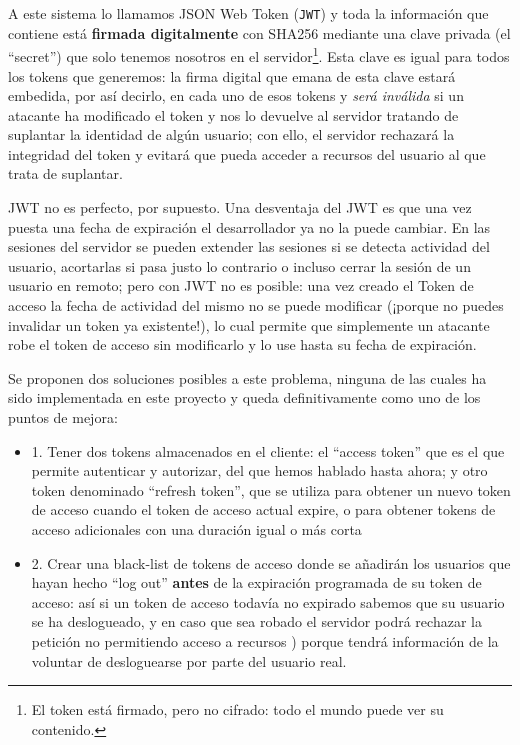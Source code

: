 \documentclass[a4paper,12pt]{report}
\begin{document}
				
				A este sistema lo llamamos JSON Web Token (\texttt{JWT}) y toda la información que contiene está \textbf{firmada digitalmente} con SHA256 mediante una clave privada (el ``secret'') que solo tenemos nosotros en el servidor\footnote{El token está firmado, pero no cifrado: todo el mundo puede ver su contenido.}. Esta clave es igual para todos los tokens que generemos: la firma digital que emana de esta clave estará embedida, por así decirlo, en cada uno de esos tokens y \textit{será inválida} si un atacante ha modificado el token y nos lo devuelve al servidor tratando de suplantar la identidad de algún usuario; con ello, el servidor rechazará la integridad del token y evitará que pueda acceder a recursos del usuario al que trata de suplantar.
				
				JWT no es perfecto, por supuesto. Una desventaja del JWT es que una vez puesta una fecha de expiración el desarrollador ya no la puede cambiar. En las sesiones del servidor se pueden extender las sesiones si se detecta actividad del usuario, acortarlas si pasa justo lo contrario o incluso cerrar la sesión de un usuario en remoto; pero con JWT no es posible: una vez creado el Token de acceso la fecha de actividad del mismo no se puede modificar (¡porque no puedes invalidar un token ya existente!), lo cual permite que simplemente un atacante robe el token de acceso sin modificarlo y lo use hasta su fecha de expiración.
				
				Se proponen dos soluciones posibles a este problema, ninguna de las cuales ha sido implementada en este proyecto y queda definitivamente como uno de los puntos de mejora:
				
				\begin{itemize}
					\setlength{\itemsep}{.0em}
				
					\item 1. Tener dos tokens almacenados en el cliente: el ``access token'' que es el que permite autenticar y autorizar, del que hemos hablado hasta ahora; y otro token denominado ``refresh token'', que se utiliza
					para obtener un nuevo token de acceso cuando el token de acceso actual expire, o para obtener tokens de acceso adicionales con una duración igual o más corta \cite{stackoverflow_refreshTokenAvantatjaSeguretat}
					
					\item 2. Crear una black-list de tokens de acceso donde se añadirán los usuarios que hayan hecho ``log out'' \textbf{antes} de la expiración programada de su token de acceso: así si un token de acceso todavía no expirado sabemos que su usuario se ha deslogueado, y en caso que sea robado el servidor podrá rechazar la petición no permitiendo acceso a recursos \cite{stackOverflow_blackList}) porque tendrá información de la voluntar de desloguearse por parte del usuario real.
 
					
				\end{itemize}
\end{document}
